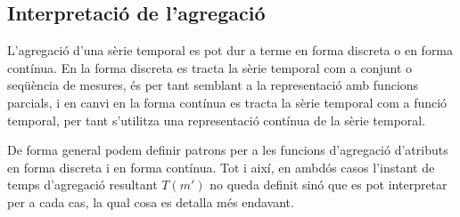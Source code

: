 


\subsection{Interpretació de l'agregació}

L'agregació d'una sèrie temporal es pot dur a terme en forma discreta
o en forma contínua.  En la forma discreta es tracta la sèrie temporal
com a conjunt o seqüència de mesures, és per tant semblant a la
representació amb funcions parcials, i en canvi en la forma contínua
es tracta la sèrie temporal com a funció temporal, per tant s'utilitza
una representació contínua de la sèrie temporal.

De forma general podem definir patrons per a les funcions d'agregació
d'atributs en forma discreta i en forma contínua. Tot i així, en
ambdós casos l'instant de temps d'agregació resultant $T(m')$ no queda
definit sinó que es pot interpretar per a cada cas, la qual cosa es detalla
més endavant.


